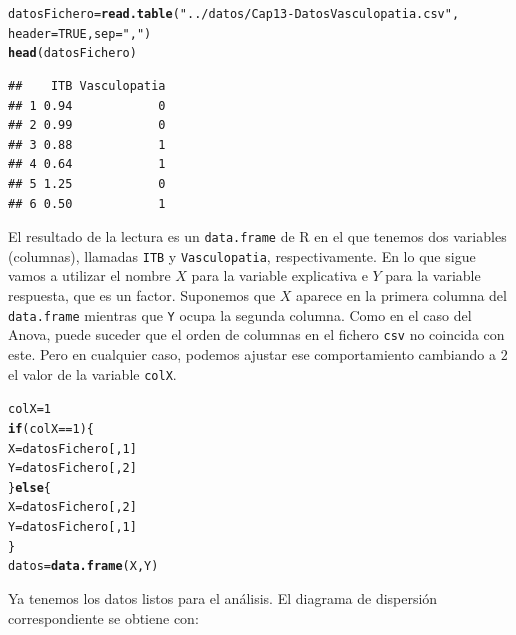 \documentclass[10pt,a4paper]{article}\usepackage[]{graphicx}\usepackage[]{color}
\makeatletter
\newcommand{\hlnum}[1]{\textcolor[rgb]{0.686,0.059,0.569}{#1}}%
\newcommand{\hlstr}[1]{\textcolor[rgb]{0.192,0.494,0.8}{#1}}%
\newcommand{\hlopt}[1]{\textcolor[rgb]{0,0,0}{#1}}%
\newcommand{\hlstd}[1]{\textcolor[rgb]{0.345,0.345,0.345}{#1}}%
\newcommand{\hlkwa}[1]{\textcolor[rgb]{0.161,0.373,0.58}{\textbf{#1}}}%
\newcommand{\hlkwb}[1]{\textcolor[rgb]{0.69,0.353,0.396}{#1}}%
\newcommand{\hlkwc}[1]{\textcolor[rgb]{0.333,0.667,0.333}{#1}}%
\newcommand{\hlkwd}[1]{\textcolor[rgb]{0.737,0.353,0.396}{\textbf{#1}}}%
\newenvironment{kframe}{%
 \def\at@end@of@kframe{}%
 \ifinner\ifhmode%
  \def\at@end@of@kframe{\end{minipage}}%
  \begin{minipage}{\columnwidth}%
 \fi\fi%
 \def\FrameCommand##1{\hskip\@totalleftmargin \hskip-\fboxsep
 \colorbox{shadecolor}{##1}\hskip-\fboxsep
     \hskip-\linewidth \hskip-\@totalleftmargin \hskip\columnwidth}%
 \MakeFramed {\advance\hsize-\width
   \@totalleftmargin\z@ \linewidth\hsize
   \@setminipage}}%
 {\par\unskip\endMakeFramed%
 \at@end@of@kframe}
\newenvironment{knitrout}{}{} %
\makeatother
\begin{document}
\begin{knitrout}
\color{fgcolor}\begin{kframe}
\begin{alltt}
\hlstd{datosFichero} \hlkwb{=} \hlkwd{read.table}\hlstd{(}\hlstr{"../datos/Cap13-DatosVasculopatia.csv"}\hlstd{,}
                          \hlkwc{header} \hlstd{=} \hlnum{TRUE}\hlstd{,} \hlkwc{sep}\hlstd{=}\hlstr{","}\hlstd{)}
\hlkwd{head}\hlstd{(datosFichero)}
\end{alltt}
\begin{verbatim}
##    ITB Vasculopatia
## 1 0.94            0
## 2 0.99            0
## 3 0.88            1
## 4 0.64            1
## 5 1.25            0
## 6 0.50            1
\end{verbatim}
\end{kframe}
\end{knitrout}

El resultado de la lectura es un {\tt data.frame} de R en el que tenemos dos variables (columnas), llamadas {\tt ITB} y {\tt Vasculopatia}, respectivamente. En lo que sigue vamos a utilizar el nombre $X$ para la variable explicativa e $Y$ para la variable respuesta, que es un factor. Suponemos que $X$ aparece en la primera columna del {\tt data.frame} mientras que {\tt Y} ocupa la segunda columna. Como en el caso del Anova, puede suceder que el orden de columnas en el fichero {\tt csv} no coincida con este. Pero en cualquier caso, podemos ajustar ese comportamiento cambiando a $2$ el valor de la variable {\tt colX}.

\begin{knitrout}
\color{fgcolor}\begin{kframe}
\begin{alltt}
\hlstd{colX} \hlkwb{=} \hlnum{1}
\hlkwa{if}\hlstd{(colX} \hlopt{==} \hlnum{1}\hlstd{)\{}
  \hlstd{X} \hlkwb{=} \hlstd{datosFichero[ ,} \hlnum{1}\hlstd{]}
  \hlstd{Y} \hlkwb{=} \hlstd{datosFichero[ ,} \hlnum{2}\hlstd{]}
\hlstd{\}} \hlkwa{else} \hlstd{\{}
  \hlstd{X} \hlkwb{=} \hlstd{datosFichero[ ,} \hlnum{2}\hlstd{]}
  \hlstd{Y} \hlkwb{=} \hlstd{datosFichero[ ,} \hlnum{1}\hlstd{]}
\hlstd{\}}
\hlstd{datos} \hlkwb{=} \hlkwd{data.frame}\hlstd{(X, Y)}
\end{alltt}
\end{kframe}
\end{knitrout}

Ya tenemos los datos listos para el análisis. El diagrama de dispersión correspondiente se obtiene con:
\end{document}

